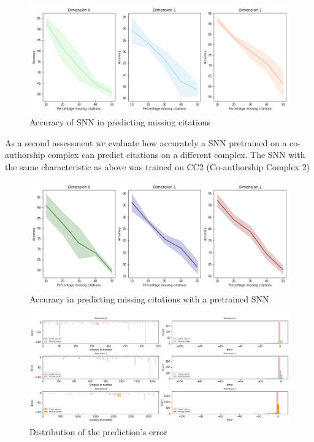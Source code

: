 \begin{figure}[htbp]
  \centering 
\includegraphics[scale=0.38]{./figures/accuracy_network1.png}
 \caption{Accuracy of SNN in predicting missing citations } \label{fig:accuracy}
\end{figure}

As a second assessment we evaluate how accurately a SNN pretrained on a co-authorship complex can predict citations on a different complex. The SNN with the same characteristic as above was trained on CC2 (Co-authorship Complex 2)




\begin{figure}[htbp]
  \centering
 
\includegraphics[scale=0.38]{./figures/accuracy_network1_pretrained.png}
  \caption{Accuracy in predicting missing citations with a pretrained SNN } \label{fig:accuracy-pretrained}
\end{figure}

\begin{figure}[htbp]

  \centering
 \hspace{-6cm}
 
\includegraphics[scale=0.4]{./figures/Error_start150250_seed6666_notsee30.png}
  \caption{Distribution of the prediction's error} \label{fig:error}
\end{figure}

